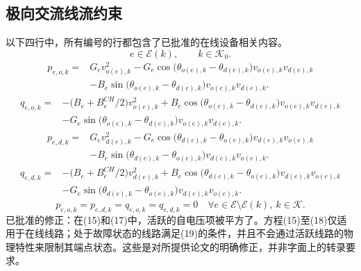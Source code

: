 \documentclass{article}
\begin{document}
\subsection*{极向交流线流约束}
以下四行中，所有编号的行都包含了已批准的在线设备相关内容。
\[
 e\in\mathcal E(k),\qquad k\in\mathcal K_0.
\]
\begin{equation}
\begin{aligned}
p_{e,o,k}={}&G_ev_{o(e),k}^{2}
-G_e\cos\bigl(\theta_{o(e),k}-\theta_{d(e),k}\bigr)v_{o(e),k}v_{d(e),k}\\
&-B_e\sin\bigl(\theta_{o(e),k}-\theta_{d(e),k}\bigr)v_{o(e),k}v_{d(e),k}.
\end{aligned}\tag{15}
\end{equation}
\begin{equation}
\begin{aligned}
q_{e,o,k}={}&-\bigl(B_e+B_e^{CH}/2\bigr)v_{o(e),k}^{2}
+B_e\cos\bigl(\theta_{o(e),k}-\theta_{d(e),k}\bigr)v_{o(e),k}v_{d(e),k}\\
&-G_e\sin\bigl(\theta_{o(e),k}-\theta_{d(e),k}\bigr)v_{o(e),k}v_{d(e),k}.
\end{aligned}\tag{16}
\end{equation}
\begin{equation}
\begin{aligned}
p_{e,d,k}={}&G_ev_{d(e),k}^{2}
-G_e\cos\bigl(\theta_{d(e),k}-\theta_{o(e),k}\bigr)v_{d(e),k}v_{o(e),k}\\
&-B_e\sin\bigl(\theta_{d(e),k}-\theta_{o(e),k}\bigr)v_{d(e),k}v_{o(e),k}.
\end{aligned}\tag{17}
\end{equation}
\begin{equation}
\begin{aligned}
q_{e,d,k}={}&-\bigl(B_e+B_e^{CH}/2\bigr)v_{d(e),k}^{2}
+B_e\cos\bigl(\theta_{d(e),k}-\theta_{o(e),k}\bigr)v_{d(e),k}v_{o(e),k}\\
&-G_e\sin\bigl(\theta_{d(e),k}-\theta_{o(e),k}\bigr)v_{d(e),k}v_{o(e),k}.
\end{aligned}\tag{18}
\end{equation}
\begin{equation}
p_{e,o,k}=p_{e,d,k}=q_{e,o,k}=q_{e,d,k}=0
\quad\forall e\in\mathcal E\setminus\mathcal E(k),\ k\in\mathcal K.
\tag{19}
\end{equation}
已批准的修正：在(15)和(17)中，活跃的自电压项被平方了。方程(15)至(18)仅适用于在线线路；处于故障状态的线路满足(19)的条件，并且不会通过活跃线路的物理特性来限制其端点状态。这些是对所提供论文的明确修正，并非字面上的转录要求。
\end{document}
